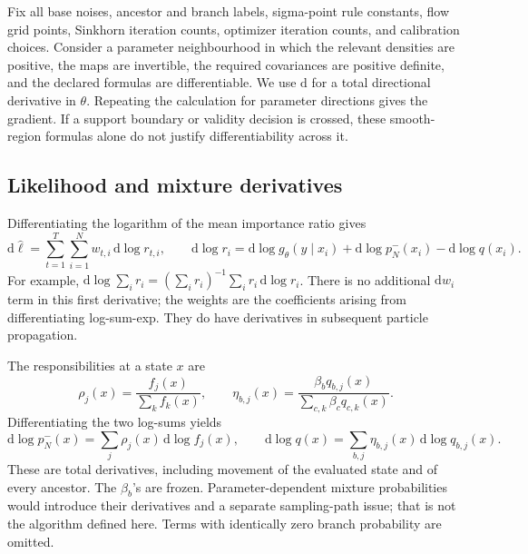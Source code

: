 \documentclass[11pt,a4paper]{article}
\newcommand{\dd}{\mathrm d}
\begin{document}
Fix all base noises, ancestor and branch labels, sigma-point rule constants,
flow grid points, Sinkhorn iteration counts, optimizer iteration counts,
and calibration choices. Consider a parameter neighbourhood in which the
relevant densities are positive, the maps are invertible, the required
covariances are positive definite, and the declared formulas are
differentiable. We use \(\dd\) for a total directional derivative in
\(\theta\). Repeating the calculation for parameter directions gives the
gradient. If a support boundary or validity decision is crossed, these
smooth-region formulas alone do not justify differentiability across it.

\subsection{Likelihood and mixture derivatives}

Differentiating the logarithm of the mean importance ratio gives
\begin{equation}
\label{eq:total-score}
 \dd\widehat\ell
 =\sum_{t=1}^T\sum_{i=1}^Nw_{t,i}\,\dd\log r_{t,i},
 \qquad
 \dd\log r_i=\dd\log g_\theta(y\mid x_i)
             +\dd\log p_N^-(x_i)-\dd\log q(x_i).
\end{equation}
For example,
\(\dd\log\sum_i r_i=(\sum_i r_i)^{-1}\sum_i r_i\,\dd\log r_i\).
There is no additional \(\dd w_i\) term in this first derivative;
the weights are the coefficients arising from differentiating log-sum-exp.
They do have derivatives in subsequent particle propagation.

The responsibilities at a state \(x\) are
\begin{equation}
\label{eq:responsibilities}
 \rho_j(x)=\frac{f_j(x)}{\sum_k f_k(x)},\qquad
 \eta_{b,j}(x)=
 \frac{\beta_bq_{b,j}(x)}
      {\sum_{c,k}\beta_cq_{c,k}(x)}.
\end{equation}
Differentiating the two log-sums yields
\begin{equation}
\label{eq:mixture-differentials}
 \dd\log p_N^-(x)=\sum_j\rho_j(x)\,\dd\log f_j(x),\qquad
 \dd\log q(x)=\sum_{b,j}\eta_{b,j}(x)\,\dd\log q_{b,j}(x).
\end{equation}
These are total derivatives, including movement of the evaluated state
and of every ancestor. The \(\beta_b\)'s are frozen. Parameter-dependent
mixture probabilities would introduce their derivatives and a separate
sampling-path issue; that is not the algorithm defined here. Terms with
identically zero branch probability are omitted.
\end{document}
